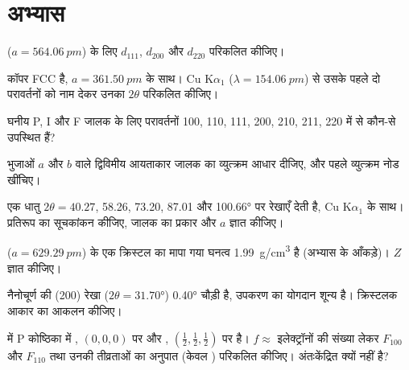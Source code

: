 \section{अभ्यास}

\begin{exercise}[$\star$]\label{exo:b3:x-ray-diffraction:1}
 ($a = \qty{564.06}{pm}$) के लिए $d_{111}$, $d_{200}$ और $d_{220}$ परिकलित कीजिए।
\end{exercise}

\begin{exercise}[$\star$]\label{exo:b3:x-ray-diffraction:2}
कॉपर FCC है, $a = \qty{361.50}{pm}$ के साथ। Cu K$\alpha_1$ ($\lambda = \qty{154.06}{pm}$) से
उसके पहले दो परावर्तनों को नाम देकर उनका $2\theta$ परिकलित कीजिए।
\end{exercise}

\begin{exercise}[$\star$]\label{exo:b3:x-ray-diffraction:3}
घनीय P, I और F जालक के लिए परावर्तनों 100, 110, 111, 200, 210, 211, 220 में से
कौन-से उपस्थित हैं?
\end{exercise}

\begin{exercise}[$\star$]\label{exo:b3:x-ray-diffraction:4}
भुजाओं $a$ और $b$ वाले द्विविमीय आयताकार जालक का व्युत्क्रम आधार दीजिए,
और पहले व्युत्क्रम नोड खींचिए।
\end{exercise}

\begin{exercise}[$\star\star$]\label{exo:b3:x-ray-diffraction:5}
एक धातु $2\theta = 40.27$, 58.26, 73.20, 87.01 और \ang{100.66} पर रेखाएँ
देती है, Cu K$\alpha_1$ के साथ। प्रतिरूप का सूचकांकन कीजिए, जालक का प्रकार और $a$ ज्ञात कीजिए।
\end{exercise}

\begin{exercise}[$\star\star$]\label{exo:b3:x-ray-diffraction:6}
 ($a = \qty{629.29}{pm}$) के एक क्रिस्टल का मापा गया घनत्व
\qty{1.99}{g/cm^3} है (अभ्यास के आँकड़े)। $Z$ ज्ञात कीजिए।
\end{exercise}

\begin{exercise}[$\star\star$]\label{exo:b3:x-ray-diffraction:7}
 नैनोचूर्ण की (200) रेखा ($2\theta = \ang{31.70}$) \ang{0.40} चौड़ी है,
उपकरण का योगदान शून्य है। क्रिस्टलक आकार का आकलन कीजिए।
\end{exercise}

\begin{exercise}[$\star\star$]\label{exo:b3:x-ray-diffraction:8}
 में P कोष्ठिका में , $(0,0,0)$ पर और , $(\frac12,\frac12,\frac12)$ पर है। $f
\approx$ इलेक्ट्रॉनों की संख्या लेकर $F_{100}$ और $F_{110}$ तथा उनकी
तीव्रताओं का अनुपात (केवल ) परिकलित कीजिए।  अंतःकेंद्रित क्यों नहीं है?
\end{exercise}

